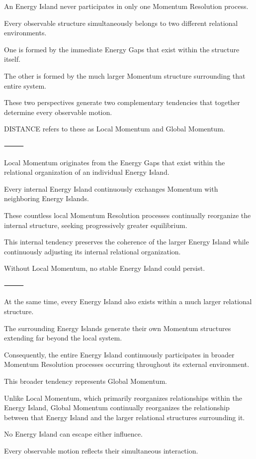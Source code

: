 An Energy Island never participates in only one Momentum Resolution process.

Every observable structure simultaneously belongs to two different relational environments.

One is formed by the immediate Energy Gaps that exist within the structure itself.

The other is formed by the much larger Momentum structure surrounding that entire system.

These two perspectives generate two complementary tendencies that together determine every observable motion.

DISTANCE refers to these as Local Momentum and Global Momentum.

⸻

Local Momentum originates from the Energy Gaps that exist within the relational organization of an individual Energy Island.

Every internal Energy Island continuously exchanges Momentum with neighboring Energy Islands.

These countless local Momentum Resolution processes continually reorganize the internal structure, seeking progressively greater equilibrium.

This internal tendency preserves the coherence of the larger Energy Island while continuously adjusting its internal relational organization.

Without Local Momentum, no stable Energy Island could persist.

⸻

At the same time, every Energy Island also exists within a much larger relational structure.

The surrounding Energy Islands generate their own Momentum structures extending far beyond the local system.

Consequently, the entire Energy Island continuously participates in broader Momentum Resolution processes occurring throughout its external environment.

This broader tendency represents Global Momentum.

Unlike Local Momentum, which primarily reorganizes relationships within the Energy Island, Global Momentum continually reorganizes the relationship between that Energy Island and the larger relational structures surrounding it.

No Energy Island can escape either influence.

Every observable motion reflects their simultaneous interaction.

